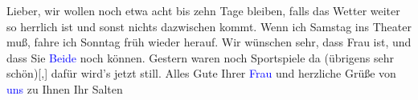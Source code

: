 \pstart
           Lieber, wir wollen noch etwa acht bis zehn Tage bleiben, falls das
               Wetter weiter so herrlich ist und sonst nichts dazwischen kommt. Wenn ich Samstag ins Theater muß, fahre ich Sonntag früh wieder herauf. Wir wünschen sehr, dass Frau
                  \label{K_L03522-1v}\label{K_L03522-1h} ist, und dass Sie \textcolor{blue}{Beide}{}\ledrightnote{{$\rightarrow$}\textcolor{blue}{Olga Schnitzler}} noch \label{K_L03522-2v}\label{K_L03522-2h} können. Gestern waren noch Sportspiele da (übrigens sehr
                  schön){[},{]} dafür wird’s jetzt still. Alles Gute Ihrer \textcolor{blue}{Frau}{}\ledrightnote{{$\rightarrow$}\textcolor{blue}{Olga Schnitzler}} und herzliche Grüße von
                  \textcolor{blue}{uns}{}\ledrightnote{{$\rightarrow$}\textcolor{blue}{Ottilie Salten}} zu Ihnen\pend
           \pstart Ihr \spacefill\mbox{Salten}\pend{}\endnumbering{}  
      